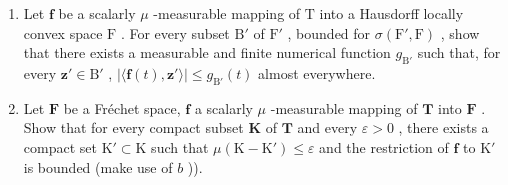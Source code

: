 \begin{enumerate}
\def\labelenumi{\alph{enumi})}
\setcounter{enumi}{1}
\item
  Let \(\mathbf{f}\) be a scalarly \(\mu\) -measurable mapping of \(\mathrm{T}\) into a Hausdorff locally convex space \(\mathrm{F}\) . For every subset \(\mathrm{B}'\) of \(\mathrm{F}'\) , bounded for \(\sigma(\mathrm{F}',\mathrm{F})\) , show that there exists a measurable and finite numerical function \(g_{\mathrm{B}'}\) such that, for every \(\mathbf{z}' \in \mathrm{B}'\) , \(|\langle \mathbf{f}(t),\mathbf{z}' \rangle| \leqslant g_{\mathrm{B}'}(t)\) almost everywhere.
\item
  Let \(\mathbf{F}\) be a Fréchet space, \(\mathbf{f}\) a scalarly \(\mu\) -measurable mapping of \(\mathbf{T}\) into \(\mathbf{F}\) . Show that for every compact subset \(\mathbf{K}\) of \(\mathbf{T}\) and every \(\varepsilon > 0\) , there exists a compact set \(\mathrm{K}' \subset \mathrm{K}\) such that \(\mu(\mathrm{K} - \mathrm{K}') \leqslant \varepsilon\) and the restriction of \(\mathbf{f}\) to \(\mathrm{K}'\) is bounded (make use of \(b\) )).
\end{enumerate}

